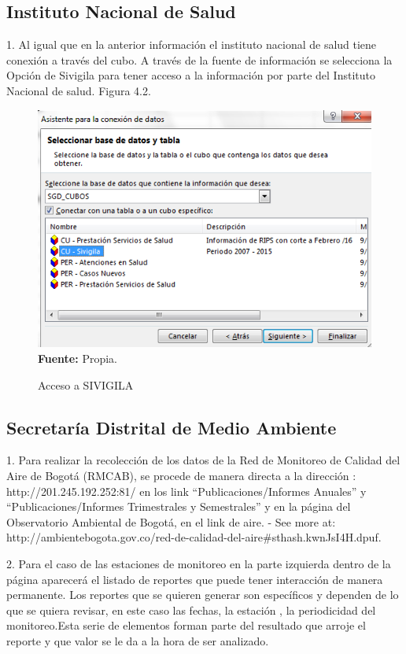 \documentclass[a4paper,openright,12pt]{book}
\theoremstyle{definition}
\theoremstyle{remark}
\begin{document}
\subsection{Instituto Nacional de Salud}

1. Al igual que en la anterior información el instituto nacional de salud tiene conexión a través del cubo. A través de la fuente de información se selecciona la Opción de Sivigila para tener acceso a la información por parte del Instituto Nacional de salud. Figura 4.2.

\begin{figure}[ht]
\centering
\caption{Acceso a SIVIGILA} 
\includegraphics[scale=0.6]{Rips5}
\label{fig:Rips6}
\\ \textbf{Fuente:} Propia.
\end{figure}

\subsection{Secretaría Distrital de Medio Ambiente}
1. Para realizar la recolección de los datos de la Red de Monitoreo de Calidad del Aire de Bogotá (RMCAB), se procede de manera directa a la dirección : http://201.245.192.252:81/ en los link  “Publicaciones/Informes Anuales” y “Publicaciones/Informes Trimestrales y Semestrales” y en la página del Observatorio Ambiental de Bogotá,  en el link de aire. - See more at: 
http://ambientebogota.gov.co/red-de-calidad-del-aire\#sthash.kwnJsI4H.dpuf.

2. Para el caso de las estaciones de monitoreo en la parte  izquierda dentro de la página aparecerá el listado de reportes que puede tener interacción de manera permanente. Los reportes que se quieren generar son específicos y dependen de lo que se quiera revisar, en este caso las fechas, la estación , la periodicidad del monitoreo.Esta serie de elementos forman parte del resultado que arroje el reporte y que valor se le da a la hora de ser analizado.
\end{document}
